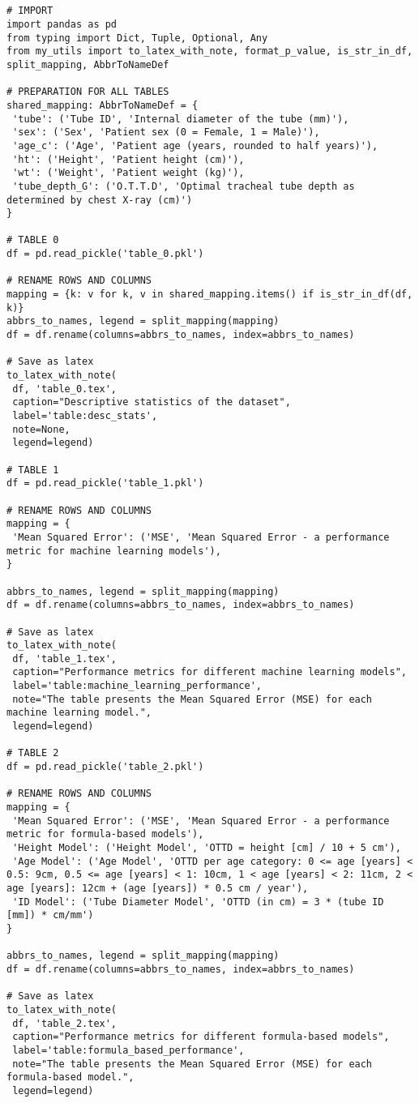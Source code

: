 \documentclass[11pt]{article}
\begin{document}
\begin{verbatim}


# IMPORT
import pandas as pd
from typing import Dict, Tuple, Optional, Any
from my_utils import to_latex_with_note, format_p_value, is_str_in_df, split_mapping, AbbrToNameDef

# PREPARATION FOR ALL TABLES
shared_mapping: AbbrToNameDef = {
 'tube': ('Tube ID', 'Internal diameter of the tube (mm)'),
 'sex': ('Sex', 'Patient sex (0 = Female, 1 = Male)'),
 'age_c': ('Age', 'Patient age (years, rounded to half years)'),
 'ht': ('Height', 'Patient height (cm)'),
 'wt': ('Weight', 'Patient weight (kg)'),
 'tube_depth_G': ('O.T.T.D', 'Optimal tracheal tube depth as determined by chest X-ray (cm)')
}

# TABLE 0
df = pd.read_pickle('table_0.pkl')

# RENAME ROWS AND COLUMNS
mapping = {k: v for k, v in shared_mapping.items() if is_str_in_df(df, k)} 
abbrs_to_names, legend = split_mapping(mapping)
df = df.rename(columns=abbrs_to_names, index=abbrs_to_names)

# Save as latex
to_latex_with_note(
 df, 'table_0.tex',
 caption="Descriptive statistics of the dataset", 
 label='table:desc_stats',
 note=None,
 legend=legend)

# TABLE 1
df = pd.read_pickle('table_1.pkl')

# RENAME ROWS AND COLUMNS
mapping = {
 'Mean Squared Error': ('MSE', 'Mean Squared Error - a performance metric for machine learning models'),
}

abbrs_to_names, legend = split_mapping(mapping)
df = df.rename(columns=abbrs_to_names, index=abbrs_to_names)

# Save as latex
to_latex_with_note(
 df, 'table_1.tex',
 caption="Performance metrics for different machine learning models", 
 label='table:machine_learning_performance',
 note="The table presents the Mean Squared Error (MSE) for each machine learning model.",
 legend=legend)

# TABLE 2
df = pd.read_pickle('table_2.pkl')

# RENAME ROWS AND COLUMNS
mapping = {
 'Mean Squared Error': ('MSE', 'Mean Squared Error - a performance metric for formula-based models'),
 'Height Model': ('Height Model', 'OTTD = height [cm] / 10 + 5 cm'),
 'Age Model': ('Age Model', 'OTTD per age category: 0 <= age [years] < 0.5: 9cm, 0.5 <= age [years] < 1: 10cm, 1 < age [years] < 2: 11cm, 2 < age [years]: 12cm + (age [years]) * 0.5 cm / year'),
 'ID Model': ('Tube Diameter Model', 'OTTD (in cm) = 3 * (tube ID [mm]) * cm/mm')
}

abbrs_to_names, legend = split_mapping(mapping)
df = df.rename(columns=abbrs_to_names, index=abbrs_to_names)

# Save as latex
to_latex_with_note(
 df, 'table_2.tex',
 caption="Performance metrics for different formula-based models", 
 label='table:formula_based_performance',
 note="The table presents the Mean Squared Error (MSE) for each formula-based model.",
 legend=legend)


\end{verbatim}
\end{document}
